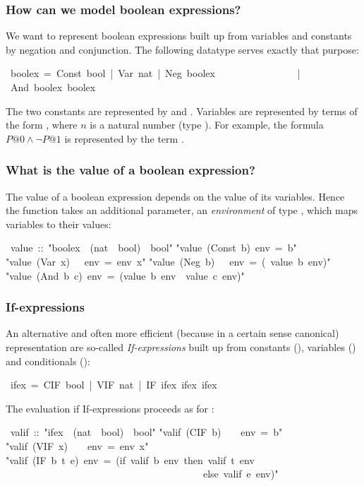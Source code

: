 \begin{isabelle}%
%
\begin{isamarkuptext}%
\subsubsection{How can we model boolean expressions?}

We want to represent boolean expressions built up from variables and
constants by negation and conjunction. The following datatype serves exactly
that purpose:%
\end{isamarkuptext}%
~boolex~=~Const~bool~|~Var~nat~|~Neg~boolex\isanewline
~~~~~~~~~~~~~~~~|~And~boolex~boolex%
\begin{isamarkuptext}%
\noindent
The two constants are represented by  and
. Variables are represented by terms of the form
, where $n$ is a natural number (type ).
For example, the formula $P@0 \land \neg P@1$ is represented by the term
.

\subsubsection{What is the value of a boolean expression?}

The value of a boolean expression depends on the value of its variables.
Hence the function  takes an additional parameter, an {\em
  environment} of type , which maps variables to
their values:%
\end{isamarkuptext}%
~value~::~{"}boolex~{\isasymRightarrow}~(nat~{\isasymRightarrow}~bool)~{\isasymRightarrow}~bool{"}\isanewline
{}\isanewline
{"}value~(Const~b)~env~=~b{"}\isanewline
{"}value~(Var~x)~~~env~=~env~x{"}\isanewline
{"}value~(Neg~b)~~~env~=~({\isasymnot}~value~b~env){"}\isanewline
{"}value~(And~b~c)~env~=~(value~b~env~{\isasymand}~value~c~env){"}%
\begin{isamarkuptext}%
\noindent
\subsubsection{If-expressions}

An alternative and often more efficient (because in a certain sense
canonical) representation are so-called \emph{If-expressions} built up
from constants (), variables () and conditionals
():%
\end{isamarkuptext}%
~ifex~=~CIF~bool~|~VIF~nat~|~IF~ifex~ifex~ifex%
\begin{isamarkuptext}%
\noindent
The evaluation if If-expressions proceeds as for :%
\end{isamarkuptext}%
~valif~::~{"}ifex~{\isasymRightarrow}~(nat~{\isasymRightarrow}~bool)~{\isasymRightarrow}~bool{"}\isanewline
{}\isanewline
{"}valif~(CIF~b)~~~~env~=~b{"}\isanewline
{"}valif~(VIF~x)~~~~env~=~env~x{"}\isanewline
{"}valif~(IF~b~t~e)~env~=~(if~valif~b~env~then~valif~t~env\isanewline
~~~~~~~~~~~~~~~~~~~~~~~~~~~~~~~~~~~~~~~~else~valif~e~env){"}%
\begin{isamarkuptext}%

\end{isamarkuptext}
\end{isabelle}
